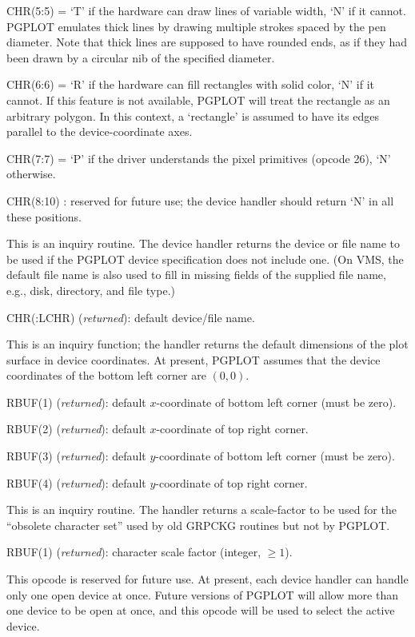 CHR(5:5) = `T' if the hardware can draw lines of variable width,  `N' if 
it cannot. PGPLOT emulates thick lines by drawing multiple strokes 
spaced by the pen diameter. Note that thick lines are supposed to have
rounded ends, as if they had been drawn by a circular nib of the 
specified diameter.

CHR(6:6) = `R' if the hardware can fill rectangles with solid
color, `N' if it cannot. If this feature is not available, PGPLOT 
will treat the rectangle as an arbitrary polygon. In this context, a 
`rectangle' is assumed to have its edges parallel to the 
device-coordinate axes.

CHR(7:7) = `P' if the driver understands the pixel primitives (opcode 
26), `N' otherwise.

CHR(8:10) : reserved for future use; the device handler should return
`N' in all these positions.

This is an inquiry routine. The device handler returns the device or file 
name to be used if the PGPLOT device specification does not include one.
(On VMS, the default file name is also used to fill in missing fields of 
the supplied file name, e.g., disk, directory, and file type.)

CHR(:LCHR) ({\it returned\/}): default device/file name.


This is an inquiry function; the handler returns the default dimensions
of the plot surface in device coordinates.  At present, PGPLOT assumes
that the device coordinates of the bottom left corner are $(0,0)$. 

RBUF(1) ({\it returned\/}): default $x$-coordinate of bottom left corner (must 
be zero).

RBUF(2) ({\it returned\/}): default $x$-coordinate of top right corner.

RBUF(3) ({\it returned\/}): default $y$-coordinate of bottom left corner (must 
be zero).

RBUF(4) ({\it returned\/}): default $y$-coordinate of top right corner.


This is an inquiry routine. The handler returns a scale-factor to be used
for the ``obsolete character set'' used by old GRPCKG routines but not 
by PGPLOT.

RBUF(1) ({\it returned\/}): character scale factor (integer, $\ge 1$).


This opcode is reserved for future use. At present, each device handler 
can handle only one open device at once. Future versions of PGPLOT will 
allow more than one device to be open at once, and this opcode will be 
used to select the active device.

